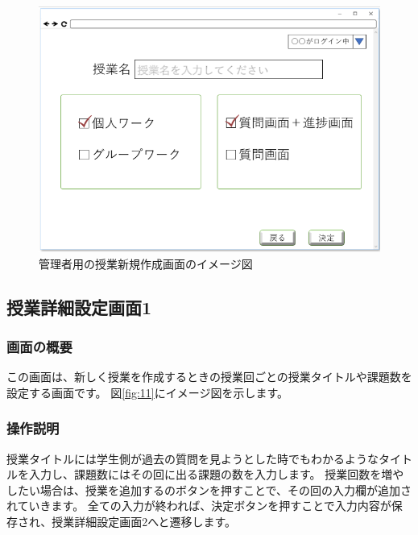 \begin{figure}[htbp]
  \begin{center}
    \includegraphics[width=1\linewidth,clip]{./img/10.png}
    \caption{管理者用の授業新規作成画面のイメージ図}\label{fig:10}
  \end{center}
\end{figure}

\newpage

\subsection{授業詳細設定画面1}
\subsubsection{画面の概要}
この画面は、新しく授業を作成するときの授業回ごとの授業タイトルや課題数を設定する画面です。
図\ref{fig:11}にイメージ図を示します。

\subsubsection{操作説明}
授業タイトルには学生側が過去の質問を見ようとした時でもわかるようなタイトルを入力し、課題数にはその回に出る課題の数を入力します。
授業回数を増やしたい場合は、授業を追加するのボタンを押すことで、その回の入力欄が追加されていきます。
全ての入力が終われば、決定ボタンを押すことで入力内容が保存され、授業詳細設定画面2へと遷移します。

